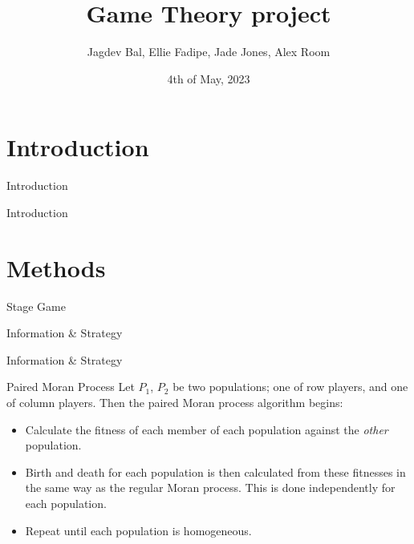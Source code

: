\documentclass{beamer}
\title{Game Theory project}
\author{Jagdev Bal, Ellie Fadipe, Jade Jones, Alex Room}
\date{4th of May, 2023}
\begin{document}
\begin{frame}
\titlepage
\end{frame}


\section{Introduction}
\begin{frame}{Introduction}

\end{frame}

\begin{frame}{Introduction}
    
\end{frame}


\section{Methods}
\begin{frame}{Stage Game}
    
\end{frame}

\begin{frame}{Information \& Strategy}
    
\end{frame}

\begin{frame}{Information \& Strategy}
    
\end{frame}

\begin{frame}{Paired Moran Process}
Let $P_1$, $P_2$ be two populations; one of row players, and one of column players. Then the paired Moran process algorithm begins:
\begin{itemize}
\item Calculate the fitness of each member of each population against the \emph{other} population.
\item Birth and death for each population is then calculated from these fitnesses in the same way as the regular Moran process. This is done independently for each population.
\item Repeat until each population is homogeneous.
\end{itemize}

\end{frame}
\end{document}
